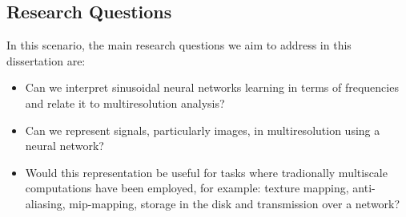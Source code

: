 







\subsection{Research Questions}

In this scenario, the main research questions we aim to address in this dissertation are:

\begin{itemize}
    \item Can we interpret sinusoidal neural networks learning in terms of frequencies and relate it to multiresolution analysis? 
    \item Can we represent signals, particularly images, in multiresolution using a neural network?
    \item Would this representation be useful for tasks where tradionally multiscale computations have been employed, for example: texture mapping, anti-aliasing, mip-mapping, storage in the disk and transmission over a network?
\end{itemize}  

